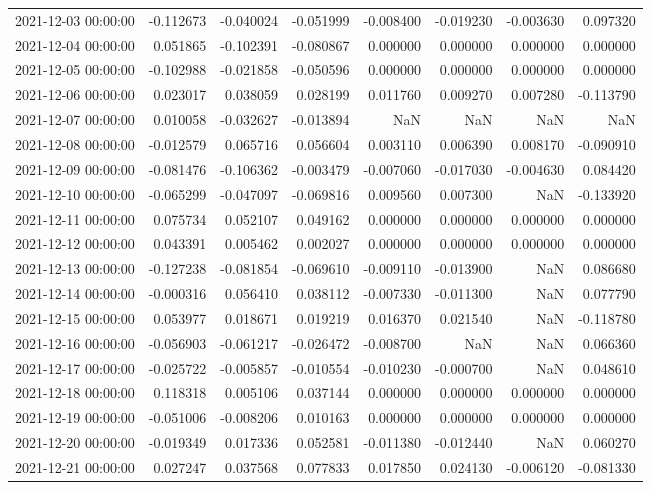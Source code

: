 \begin{tabular}{lrrrrrrr}
2021-12-03 00:00:00 & -0.112673 & -0.040024 & -0.051999 & -0.008400 & -0.019230 & -0.003630 & 0.097320 \\
2021-12-04 00:00:00 & 0.051865 & -0.102391 & -0.080867 & 0.000000 & 0.000000 & 0.000000 & 0.000000 \\
2021-12-05 00:00:00 & -0.102988 & -0.021858 & -0.050596 & 0.000000 & 0.000000 & 0.000000 & 0.000000 \\
2021-12-06 00:00:00 & 0.023017 & 0.038059 & 0.028199 & 0.011760 & 0.009270 & 0.007280 & -0.113790 \\
2021-12-07 00:00:00 & 0.010058 & -0.032627 & -0.013894 & NaN & NaN & NaN & NaN \\
2021-12-08 00:00:00 & -0.012579 & 0.065716 & 0.056604 & 0.003110 & 0.006390 & 0.008170 & -0.090910 \\
2021-12-09 00:00:00 & -0.081476 & -0.106362 & -0.003479 & -0.007060 & -0.017030 & -0.004630 & 0.084420 \\
2021-12-10 00:00:00 & -0.065299 & -0.047097 & -0.069816 & 0.009560 & 0.007300 & NaN & -0.133920 \\
2021-12-11 00:00:00 & 0.075734 & 0.052107 & 0.049162 & 0.000000 & 0.000000 & 0.000000 & 0.000000 \\
2021-12-12 00:00:00 & 0.043391 & 0.005462 & 0.002027 & 0.000000 & 0.000000 & 0.000000 & 0.000000 \\
2021-12-13 00:00:00 & -0.127238 & -0.081854 & -0.069610 & -0.009110 & -0.013900 & NaN & 0.086680 \\
2021-12-14 00:00:00 & -0.000316 & 0.056410 & 0.038112 & -0.007330 & -0.011300 & NaN & 0.077790 \\
2021-12-15 00:00:00 & 0.053977 & 0.018671 & 0.019219 & 0.016370 & 0.021540 & NaN & -0.118780 \\
2021-12-16 00:00:00 & -0.056903 & -0.061217 & -0.026472 & -0.008700 & NaN & NaN & 0.066360 \\
2021-12-17 00:00:00 & -0.025722 & -0.005857 & -0.010554 & -0.010230 & -0.000700 & NaN & 0.048610 \\
2021-12-18 00:00:00 & 0.118318 & 0.005106 & 0.037144 & 0.000000 & 0.000000 & 0.000000 & 0.000000 \\
2021-12-19 00:00:00 & -0.051006 & -0.008206 & 0.010163 & 0.000000 & 0.000000 & 0.000000 & 0.000000 \\
2021-12-20 00:00:00 & -0.019349 & 0.017336 & 0.052581 & -0.011380 & -0.012440 & NaN & 0.060270 \\
2021-12-21 00:00:00 & 0.027247 & 0.037568 & 0.077833 & 0.017850 & 0.024130 & -0.006120 & -0.081330 \\

\end{tabular}
